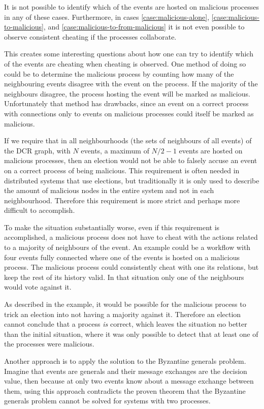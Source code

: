	\newpar It is not possible to identify which of the events are hosted on malicious processes in any of these cases. Furthermore, in cases \ref{case:malicious-alone}, \ref{case:malicious-to-malicious}, and \ref{case:malicious-to-from-malicious} it is not even possible to observe consistent cheating if the processes collaborate.
	
	\newpar This creates some interesting questions about how one can try to identify which of the events are cheating when cheating is observed. One method of doing so could be to determine the malicious process by counting how many of the neighbouring events disagree with the event on the process. If the majority of the neighbours disagree, the process hosting the event will be marked as malicious. Unfortunately that method has drawbacks, since an event on a correct process with connections only to events on malicious processes could itself be marked as malicious. 
	
	If we require that in all neighbourhoods (the sets of neighbours of all events) of the DCR graph, with $N$ events, a maximum of $N/2-1$ events are hosted on malicious processes, then an election would not be able to falsely accuse an event on a correct process of being malicious. This requirement is often needed in distributed systems that use elections, but traditionally it is only used to describe the amount of malicious nodes in the entire system and not in each neighbourhood. Therefore this requirement is more strict and perhaps more difficult to accomplish.
	
	To make the situation substantially worse, even if this requirement is accomplished, a malicious process does not have to cheat with the actions related to a majority of neighbours of the event. An example could be a workflow with four events fully connected where one of the events is hosted on a malicious process. The malicious process could consistently cheat with one its relations, but keep the rest of its history valid. In that situation only one of the neighbours would vote against it. 
	
	As described in the example, it would be possible for the malicious process to trick an election into not having a majority against it. Therefore an election cannot conclude that a process \textit{is} correct, which leaves the situation no better than the initial situation, where it was only possible to detect that at least one of the processes were malicious.
	
	\newpar Another approach is to apply the solution to the Byzantine generals problem. Imagine that events are generals and their message exchanges are the decision value, then because at only two events know about a message exchange between them, using this approach contradicts the proven theorem that the Byzantine generals problem cannot be solved for systems with two processes.
	
